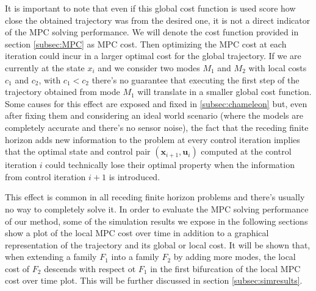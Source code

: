 \documentclass[12,twoside]{TFG-GM}
\theoremstyle{definition}
\theoremstyle{remark}
\begin{document}
It is important to note that even if this global cost function is used score how close the obtained trajectory was from the desired one, it is not a direct indicator of the MPC solving performance. We will denote the cost function provided in section \ref{subsec:MPC} as MPC cost. Then optimizing the MPC cost at each iteration could incur in a larger optimal cost for the global trajectory. If we are currently at the state $x_i$ and we consider two modes $M_1$ and $M_2$ with local costs $c_1$ and $c_2$, with $c_1 < c_2$ there's no guarantee that executing the first step of the trajectory obtained from mode $M_1$ will translate in a smaller global cost function. Some causes for this effect are exposed and fixed in \ref{subsec:chameleon} but, even after fixing them and considering an ideal world scenario (where the models are completely accurate and there's no sensor noise), the fact that the receding finite horizon adds new information to the problem at every control iteration implies that the optimal state and control pair $(\textbf{x}_{i+1}, \textbf{u}_{i})$ computed at the control iteration $i$ could technically lose their optimal property when the information from control iteration $i+1$ is introduced.

This effect is common in all receding finite horizon problems and there's usually no way to completely solve it. In order to evaluate the MPC solving performance of our method, some of the simulation results we expose in the following sections show a plot of the local MPC cost over time in addition to a graphical representation of the trajectory and its global or local cost. It will be shown that, when extending a family $F_1$ into a family $F_2$ by adding more modes, the local cost of $F_2$ descends with respect ot $F_1$ in the first bifurcation of the local MPC cost over time plot. This will be further discussed in section \ref{subsec:simresults}.
\end{document}
